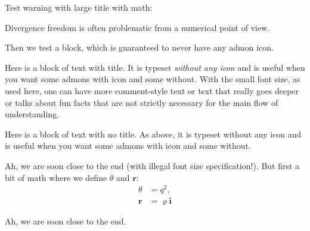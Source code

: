 \documentclass[%
oneside,                 %
final,                   %
10pt]{article}
\newenvironment{noticeshaded}
{\def\FrameCommand{\fboxsep=3mm\colorbox{colors1_notice_background}}
 \MakeFramed {\advance\hsize-\width \FrameRestore}}{\endMakeFramed}
\newenvironment{notice_colors1admon}[1][Notice]{
\begin{noticeshaded}
\noindent
\texttt{[image: latex\_figs/notice]}\ \ \   \textbf{#1}\\ \par
\vspace{-3mm}\nobreak\noindent\ignorespaces
}
{
\end{noticeshaded}
}
\newenvironment{warningshaded}
{\def\FrameCommand{\fboxsep=3mm\colorbox{colors1_warning_background}}
 \MakeFramed {\advance\hsize-\width \FrameRestore}}{\endMakeFramed}
\newenvironment{warning_colors1admon}[1][Warning]{
\begin{warningshaded}
\noindent
\texttt{[image: latex\_figs/warning]}\ \ \   \textbf{#1}\\ \par
\vspace{-3mm}\nobreak\noindent\ignorespaces
}
{
\end{warningshaded}
}
\newenvironment{blockshaded}
{\def\FrameCommand{\fboxsep=3mm\colorbox{colors1_block_background}}
 \MakeFramed {\advance\hsize-\width \FrameRestore}}{\endMakeFramed}
\newenvironment{block_colors1admon}[1][Block]{
\begin{blockshaded}
\noindent
  \textbf{#1}\\ \par
\vspace{-3mm}\nobreak\noindent\ignorespaces
}
{
\end{blockshaded}
}
\begin{document}
Test warning with large title with math:

\begin{warning_colors1admon}[{\large Watch out for $\nabla\cdot\bm{u}=0$ equations}]
{\large Divergence freedom is often problematic from a numerical point
of view.
\par}
\end{warning_colors1admon} %


Then we test a block, which is guaranteed to never have any admon icon.

\begin{block_colors1admon}
\vspace{-3.5mm}\par\noindent
{\footnotesize Here is a block of text with title. It is typeset
\emph{without any icon} and is useful when you want some admons with icon
and some without. With the small font size, as used here, one can have
more comment-style text or text that really goes deeper or talks
about fun facts that are not strictly necessary for the main flow
of understanding.
\par}
\end{block_colors1admon} %



\begin{block_colors1admon}[]
Here is a block of text with no title. As above, it is typeset without any icon
and is useful when you want some admons with icon and some without.
\end{block_colors1admon} %



\begin{notice_colors1admon}
Ah, we are soon close to the end (with illegal font size specification!).
But first a bit of math where we define $\theta$ and $\bm{r}$:
\begin{align*}
\theta &= q^2,\\
\bm{r} &= \varrho\bm{i}
\end{align*}
\end{notice_colors1admon} %



\begin{notice_colors1admon}[Point1]
Ah, we are soon close to the end.
\end{notice_colors1admon} %
\end{document}
